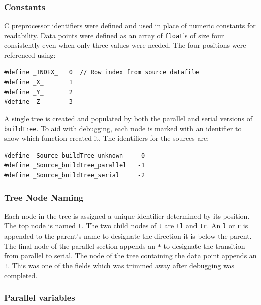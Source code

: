 \documentclass{article}
\begin{document}
%
%

\subsubsection{Constants}\label{sec:constants}

C preprocessor identifiers were defined and used in place of numeric constants for readability. Data points were defined as an array of \texttt{float}'s of size four consistently even when only three values were needed. The four positions were referenced using:

\lstset{language=C++, keepspaces=true}
\begin{lstlisting}
#define _INDEX_   0  // Row index from source datafile
#define _X_       1
#define _Y_       2
#define _Z_       3
\end{lstlisting}

A single tree is created and populated by both the parallel and serial versions of \texttt{buildTree}. To aid with debugging, each node is marked with an identifier to show which function created it. The identifiers for the sources are:

\lstset{language=C++, keepspaces=true}
\begin{lstlisting}
#define _Source_buildTree_unknown     0
#define _Source_buildTree_parallel   -1
#define _Source_buildTree_serial     -2
\end{lstlisting}

%
%

\subsubsection{Tree Node Naming}

Each node in the tree is assigned a unique identifier determined by its position. The top node is named \texttt{t}. The two child nodes of \texttt{t} are \texttt{tl} and \texttt{tr}. An \texttt{l} or \texttt{r} is appended to the parent's name to designate the direction it is below the parent. The final node of the parallel section appends an \texttt{*} to designate the transition from parallel to serial. The node of the tree containing the data point appends an \texttt{!}. This was one of the fields which was trimmed away after debugging was completed.

%
%

\subsubsection{Parallel variables}
\end{document}
